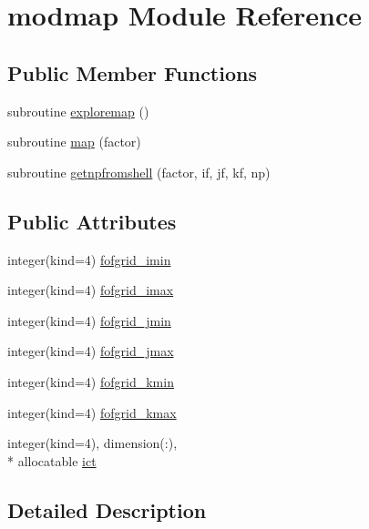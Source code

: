 \hypertarget{classmodmap}{\section{modmap Module Reference}
\label{classmodmap}
}
\subsection*{Public Member Functions}
\begin{DoxyCompactItemize}
\item 
subroutine \hyperlink{classmodmap_a4dabe74fe33947e22abfde9897dff20b}{exploremap} ()
\item 
subroutine \hyperlink{classmodmap_af6328324bc6aaca47018ded5f4c8e8cb}{map} (factor)
\item 
subroutine \hyperlink{classmodmap_a61603fa7aecee06e2efaa0c647e35df6}{getnpfromshell} (factor, if, jf, kf, np)
\end{DoxyCompactItemize}
\subsection*{Public Attributes}
\begin{DoxyCompactItemize}
\item 
integer(kind=4) \hyperlink{classmodmap_a4c96661037ebd0e043cf2967b7e94067}{fofgrid\-\_\-imin}
\item 
integer(kind=4) \hyperlink{classmodmap_adf255364fd93d9af29d1f179bf50f5ba}{fofgrid\-\_\-imax}
\item 
integer(kind=4) \hyperlink{classmodmap_ac44fd964c6a2812634e903df91c5bcb6}{fofgrid\-\_\-jmin}
\item 
integer(kind=4) \hyperlink{classmodmap_a1644332b29d20583060c9316d8cd2fa1}{fofgrid\-\_\-jmax}
\item 
integer(kind=4) \hyperlink{classmodmap_ac4f40bdda34481044d92691776976abc}{fofgrid\-\_\-kmin}
\item 
integer(kind=4) \hyperlink{classmodmap_a7273a00ef7481fa382b6016d39a752e3}{fofgrid\-\_\-kmax}
\item 
integer(kind=4), dimension(\-:), \\*
allocatable \hyperlink{classmodmap_af68652ecce879493f3a84180017cccbd}{ict}
\end{DoxyCompactItemize}


\subsection{Detailed Description}


